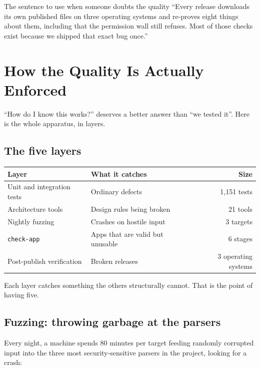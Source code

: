 \documentclass[11pt,a4paper]{report}
\begin{document}
\begin{factbox}{The sentence to use when someone doubts the quality}
``Every release downloads its own published files on three operating
systems and re-proves eight things about them, including that the
permission wall still refuses. Most of those checks exist because we
shipped that exact bug once.''
\end{factbox}

\chapter{How the Quality Is Actually Enforced}

``How do I know this works?'' deserves a better answer than ``we tested
it''. Here is the whole apparatus, in layers.

\section{The five layers}

\begin{center}
\begin{tabular}{lp{5.4cm}r}
\toprule
\textbf{Layer} & \textbf{What it catches} & \textbf{Size} \\
\midrule
Unit and integration tests & Ordinary defects & 1{,}151 tests \\
Architecture tools & Design rules being broken & 21 tools \\
Nightly fuzzing & Crashes on hostile input & 3 targets \\
\texttt{check-app} & Apps that are valid but unusable & 6 stages \\
Post-publish verification & Broken releases & 3 operating systems \\
\bottomrule
\end{tabular}
\end{center}

Each layer catches something the others structurally cannot. That is the
point of having five.

\section{Fuzzing: throwing garbage at the parsers}

Every night, a machine spends 80 minutes per target feeding randomly
corrupted input into the three most security-sensitive parsers in the
project, looking for a crash:
\end{document}
